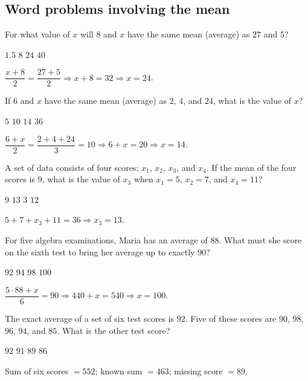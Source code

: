 \newpage\subsection*{Word problems involving the mean}

\question[5]
For what value of $x$ will $8$ and $x$ have the same mean (average) as $27$ and $5$?
\begin{choices}
  \choice $1.5$
  \choice $8$
  \CorrectChoice $24$
  \choice $40$
\end{choices}
\begin{solution}
  $\dfrac{x+8}{2}=\dfrac{27+5}{2}\Rightarrow x+8=32\Rightarrow x=24$.
\end{solution}

\question[5]
If $6$ and $x$ have the same mean (average) as $2$, $4$, and $24$, what is the value of $x$?
\begin{choices}
  \choice $5$
  \choice $10$
  \CorrectChoice $14$
  \choice $36$
\end{choices}
\begin{solution}
  $\dfrac{6+x}{2}=\dfrac{2+4+24}{3}=10\Rightarrow 6+x=20\Rightarrow x=14$.
\end{solution}

\question[5]
A set of data consists of four scores: $x_{1}$, $x_{2}$, $x_{3}$, and $x_{4}$. If the mean of the four scores is $9$, what is the value of $x_{3}$ when $x_{1}=5$, $x_{2}=7$, and $x_{4}=11$?
\begin{choices}
  \choice $9$
  \CorrectChoice $13$
  \choice $3$
  \choice $12$
\end{choices}
\begin{solution}
  $5+7+x_{3}+11=36\Rightarrow x_{3}=13$.
\end{solution}

\question[5]
For five algebra examinations, Maria has an average of $88$. What must she score on the sixth test to bring her average up to exactly $90$?
\begin{choices}
  \choice $92$
  \choice $94$
  \choice $98$
  \CorrectChoice $100$
\end{choices}
\begin{solution}
  $\dfrac{5\cdot 88 + x}{6}=90\Rightarrow 440+x=540\Rightarrow x=100$.
\end{solution}


\newpage



\question[5]
The exact average of a set of six test scores is $92$. Five of these scores are $90$, $98$, $96$, $94$, and $85$. What is the other test score?
\begin{choices}
  \choice $92$
  \choice $91$
  \CorrectChoice $89$
  \choice $86$
\end{choices}
\begin{solution}
  Sum of six scores $=552$; known sum $=463$; missing score $=89$.
\end{solution}

